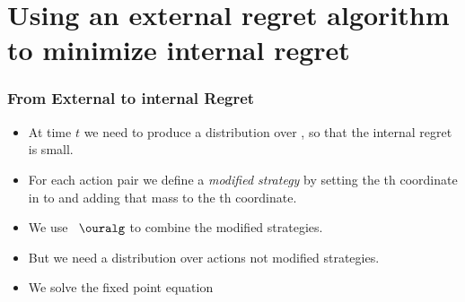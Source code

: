 \documentclass{beamer}
\begin{document}
\section{Using an external regret algorithm to minimize internal regret}
\begin{frame}
\frametitle{From External to internal Regret}
\begin{itemize}
\item At time $t$ we need to produce a distribution  over
   , so that the internal regret is small.
\item For each action pair  we define a 
{\em modified strategy}  by setting the th
coordinate in  to  and adding that mass to the
th coordinate.
\item We use~ $\ouralg$ to combine the  modified
  strategies. 
\item But we need a distribution over  actions not 
  modified strategies.
\item We solve the fixed point equation
\end{itemize}
\end{frame}
\end{document}
